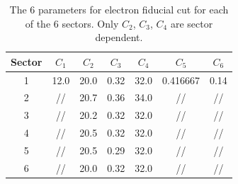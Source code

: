 \vspace{1cm}
\begin{table}[h]
 \begin{center}
  \begin{tabular}{|c|c|c|c|c|c|c|}
    \hline 
   Sector & $C_1$ & $C_2$ & $C_3$ & $C_4$     & $C_5$ & $C_6$ \\
    \hline  
   1 &     12.0 &  20.0 &  0.32 &  32.0 &  0.416667 &  0.14 \\
   2 &     //   &  20.7 &  0.36 &  34.0 &  //       &  // \\
   3 &     //   &  20.2 &  0.32 &  32.0 &  //       &  // \\
   4 &     //   &  20.5 &  0.32 &  32.0 &  //       &  // \\
   5 &     //   &  20.5 &  0.29 &  32.0 &  //       &  // \\
   6 &     //   &  20.0 &  0.32 &  32.0 &  //       &  // \\
 \hline
  \end{tabular}
 \end{center} 
 \caption[The 6 parameters for electron fiducial cut for each of the 6 sectors.]
         { The 6 parameters for electron fiducial cut for each of the 6 sectors. 
	            Only $C_2$, $C_3$, $C_4$ are sector dependent. }
 \label{tab:fid_epars}
\end{table}

